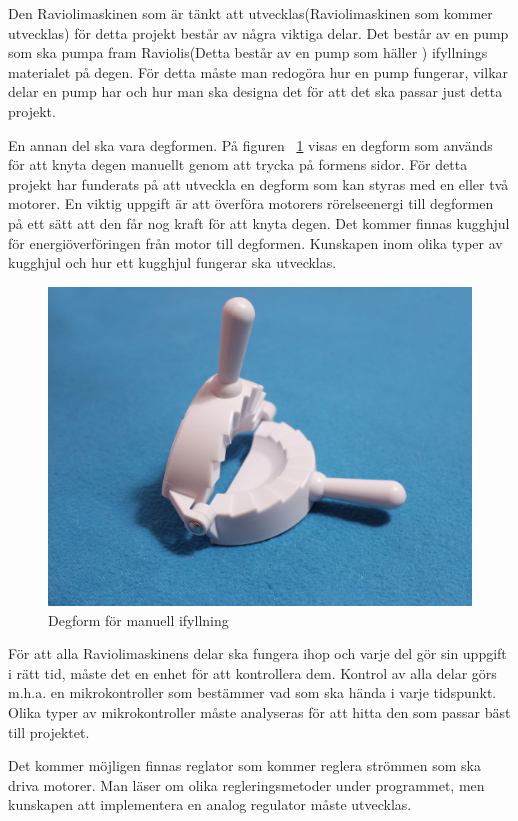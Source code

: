 Den Raviolimaskinen som är tänkt att utvecklas(Raviolimaskinen som kommer utvecklas) för detta projekt består av några viktiga delar. Det består av en pump som ska pumpa fram Raviolis(Detta består av en pump som häller ) ifyllnings materialet på degen. För detta måste man redogöra hur en pump fungerar, vilkar delar en pump har och hur man ska designa det för att det ska passar just detta projekt.\medskip

En annan del ska vara degformen. På figuren ~\ref{degfrom} visas en degform som används för att knyta degen manuellt genom att trycka på formens sidor. För detta projekt har funderats på att utveckla en degform som kan styras med en eller två motorer. En viktig uppgift är att överföra motorers rörelseenergi till degformen på ett sätt att den får nog kraft för att knyta degen. Det kommer finnas kugghjul för energiöverföringen från motor till degformen. Kunskapen inom olika typer av kugghjul och hur ett kugghjul fungerar ska utvecklas.\medskip

\begin{figure}[h]
	\begin{center}
		\includegraphics[scale=0.08] {images/degform.jpg}
		\caption{Degform för manuell ifyllning}
		\label{degfrom}	
	\end{center}
\end{figure}\medskip

För att alla Raviolimaskinens delar ska fungera ihop och varje del gör sin uppgift i rätt tid, måste det en enhet för att kontrollera dem. Kontrol av alla delar görs m.h.a. en mikrokontroller som bestämmer vad som ska hända i varje tidspunkt. Olika typer av mikrokontroller måste analyseras för att hitta den som passar bäst till projektet.

Det kommer möjligen finnas reglator som kommer reglera strömmen som ska driva motorer. Man läser om olika regleringsmetoder under programmet, men kunskapen att implementera en analog regulator måste utvecklas.




